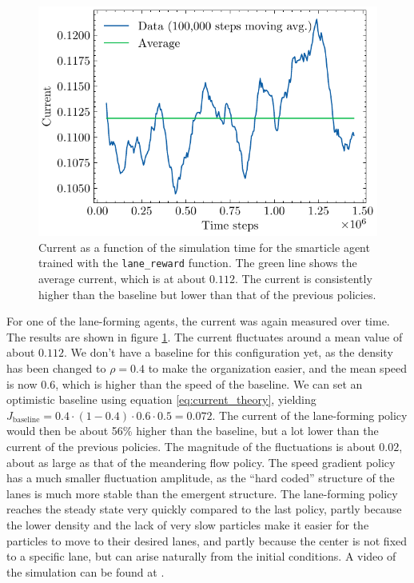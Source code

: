 \begin{figure}[h]
    \centering
    \includegraphics{lanes_current.pdf}
    \caption{Current as a function of the simulation time for the smarticle agent trained with the \texttt{lane\_reward} function. The green line shows the average current, which is at about $0.112$. The current is consistently higher than the baseline but lower than that of the previous policies.}
    \label{fig:lanes_current}
\end{figure}

For one of the lane-forming agents, the current was again measured over time. The results are shown in figure \ref{fig:lanes_current}. The current fluctuates around a mean value of about $0.112$. We don't have a baseline for this configuration yet, as the density has been changed to $\rho=0.4$ to make the organization easier, and the mean speed is now $0.6$, which is higher than the speed of the baseline. We can set an optimistic baseline using equation \ref{eq:current_theory}, yielding $J_{\text{baseline}}=0.4\cdot(1-0.4)\cdot0.6\cdot0.5=0.072$. The current of the lane-forming policy would then be about 56\% higher than the baseline, but a lot lower than the current of the previous policies. The magnitude of the fluctuations is about $0.02$, about as large as that of the meandering flow policy. The speed gradient policy has a much smaller fluctuation amplitude, as the \enquote{hard coded} structure of the lanes is much more stable than the emergent structure. The lane-forming policy reaches the steady state very quickly compared to the last policy, partly because the lower density and the lack of very slow particles make it easier for the particles to move to their desired lanes, and partly because the center is not fixed to a specific lane, but can arise naturally from the initial conditions. A video of the simulation can be found at \cite{maertens_smarticle_lane_vid_local}.


